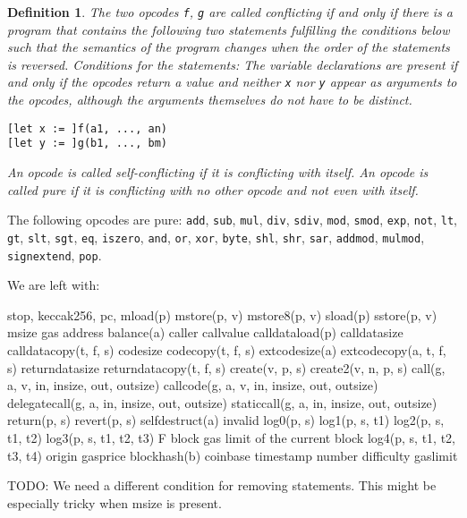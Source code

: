 \documentclass[11pt,letterpaper]{article}
\newtheorem{definition}[dummytheorem]{Definition}
\begin{document}
\begin{definition}
The two opcodes \verb|f|, \verb|g| are called \emph{conflicting} if and only if
there is a program that
contains the following two statements
fulfilling the conditions below
such that the semantics of the program changes when the order
of the statements is reversed.
Conditions for the statements: The variable declarations are present
if and only if the opcodes return a value
and neither \verb|x| nor \verb|y| appear as arguments
to the opcodes, although the arguments themselves do not
have to be distinct.
\begin{verbatim}
[let x := ]f(a1, ..., an)
[let y := ]g(b1, ..., bm)
\end{verbatim}
An opcode is called \emph{self-conflicting} if it is conflicting
with itself. An opcode is called \emph{pure} if it is conflicting
with no other opcode and not even with itself.
\end{definition}

The following opcodes are pure:
\verb|add|, \verb|sub|, \verb|mul|, \verb|div|, \verb|sdiv|,
\verb|mod|, \verb|smod|, \verb|exp|, \verb|not|, \verb|lt|,
\verb|gt|, \verb|slt|, \verb|sgt|, \verb|eq|, \verb|iszero|,
\verb|and|, \verb|or|, \verb|xor|, \verb|byte|, \verb|shl|,
\verb|shr|, \verb|sar|, \verb|addmod|, \verb|mulmod|,
\verb|signextend|, \verb|pop|.

We are left with:

stop,
keccak256,
pc,
mload(p)
mstore(p, v)
mstore8(p, v)
sload(p)
sstore(p, v)
msize
gas
address
balance(a)
caller
callvalue
calldataload(p)
calldatasize
calldatacopy(t, f, s)
codesize
codecopy(t, f, s)
extcodesize(a)
extcodecopy(a, t, f, s)
returndatasize
returndatacopy(t, f, s)
create(v, p, s)
create2(v, n, p, s)
call(g, a, v, in, insize, out, outsize)
callcode(g, a, v, in, insize, out, outsize)
delegatecall(g, a, in, insize, out, outsize)
staticcall(g, a, in, insize, out, outsize)
return(p, s)
revert(p, s)
selfdestruct(a)
invalid
log0(p, s)
log1(p, s, t1)
log2(p, s, t1, t2)
log3(p, s, t1, t2, t3) 	  	F 	block gas limit of the current block
log4(p, s, t1, t2, t3, t4)
origin
gasprice
blockhash(b)
coinbase
timestamp
number
difficulty
gaslimit

TODO: We need a different condition for removing
statements. This might be especially tricky when
msize is present.
\end{document}
